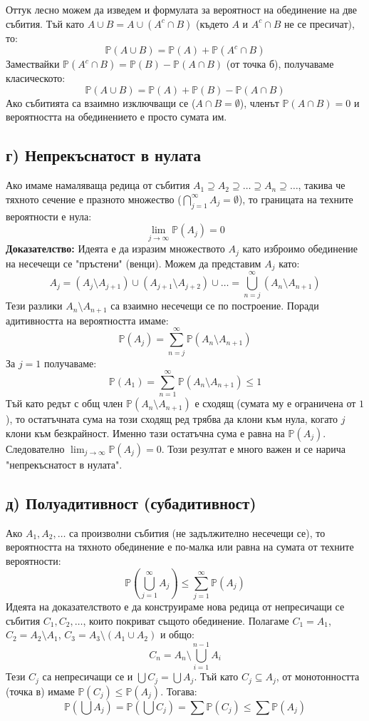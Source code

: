 \documentclass{article}
\begin{document}
Оттук лесно можем да изведем и формулата за вероятност на обединение на две събития. Тъй като $A \cup B = A \cup (A^c \cap B)$ (където $A$ и $A^c \cap B$ не се пресичат), то:
\[ \mathbb{P}(A \cup B) = \mathbb{P}(A) + \mathbb{P}(A^c \cap B) \]
Замествайки $\mathbb{P}(A^c \cap B) = \mathbb{P}(B) - \mathbb{P}(A \cap B)$ (от точка б), получаваме класическото:
\[ \mathbb{P}(A \cup B) = \mathbb{P}(A) + \mathbb{P}(B) - \mathbb{P}(A \cap B) \]
Ако събитията са взаимно изключващи се ($A \cap B = \emptyset$), членът $\mathbb{P}(A \cap B) = 0$ и вероятността на обединението е просто сумата им.

\subsection{г) Непрекъснатост в нулата}
Ако имаме намаляваща редица от събития $A_1 \supseteq A_2 \supseteq \dots \supseteq A_n \supseteq \dots$, такива че тяхното сечение е празното множество ($\bigcap_{j=1}^\infty A_j = \emptyset$), то границата на техните вероятности е нула:
\[ \lim_{j \to \infty} \mathbb{P}(A_j) = 0 \]
\textbf{Доказателство:} Идеята е да изразим множеството $A_j$ като изброимо обединение на несечещи се "пръстени" (венци). Можем да представим $A_j$ като:
\[ A_j = (A_j \setminus A_{j+1}) \cup (A_{j+1} \setminus A_{j+2}) \cup \dots = \bigcup_{n=j}^{\infty} (A_n \setminus A_{n+1}) \]
Тези разлики $A_n \setminus A_{n+1}$ са взаимно несечещи се по построение. Поради адитивността на вероятността имаме:
\[ \mathbb{P}(A_j) = \sum_{n=j}^{\infty} \mathbb{P}(A_n \setminus A_{n+1}) \]
За $j=1$ получаваме:
\[ \mathbb{P}(A_1) = \sum_{n=1}^{\infty} \mathbb{P}(A_n \setminus A_{n+1}) \le 1 \]
Тъй като редът с общ член $\mathbb{P}(A_n \setminus A_{n+1})$ е сходящ (сумата му е ограничена от $1$), то остатъчната сума на този сходящ ред трябва да клони към нула, когато $j$ клони към безкрайност. Именно тази остатъчна сума е равна на $\mathbb{P}(A_j)$. Следователно $\lim_{j \to \infty} \mathbb{P}(A_j) = 0$. Този резултат е много важен и се нарича "непрекъснатост в нулата".

\subsection{д) Полуадитивност (субадитивност)}
Ако $A_1, A_2, \dots$ са произволни събития (не задължително несечещи се), то вероятността на тяхното обединение е по-малка или равна на сумата от техните вероятности:
\[ \mathbb{P}\left(\bigcup_{j=1}^{\infty} A_j\right) \le \sum_{j=1}^{\infty} \mathbb{P}(A_j) \]
Идеята на доказателството е да конструираме нова редица от непресичащи се събития $C_1, C_2, \dots$, които покриват същото обединение. Полагаме $C_1 = A_1$, $C_2 = A_2 \setminus A_1$, $C_3 = A_3 \setminus (A_1 \cup A_2)$ и общо:
\[ C_n = A_n \setminus \bigcup_{i=1}^{n-1} A_i \]
Тези $C_j$ са непресичащи се и $\bigcup C_j = \bigcup A_j$. Тъй като $C_j \subseteq A_j$, от монотонността (точка в) имаме $\mathbb{P}(C_j) \le \mathbb{P}(A_j)$. Тогава:
\[ \mathbb{P}\left(\bigcup A_j\right) = \mathbb{P}\left(\bigcup C_j\right) = \sum \mathbb{P}(C_j) \le \sum \mathbb{P}(A_j) \]
\end{document}
